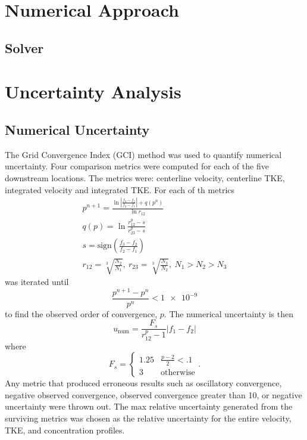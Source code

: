 \documentclass[11 pt]{article}
\begin{document}

\section{Numerical Approach}
\subsection{Solver}

\section{Uncertainty Analysis}
\subsection{Numerical Uncertainty}
	The Grid Convergence Index (GCI) method was used to quantify numerical uncertainty. Four comparison metrics were computed for each of the five downstream locations. The metrics were: centerline velocity, centerline TKE, integrated velocity and integrated TKE. For each of th metrics
		\begin{equation}
		\begin{gathered}
			p^{n+1} = \frac{\ln{|\frac{f_3 - f_2}{f_2 - f_1}|} + q(p^n)}{\ln{r_{12}}} \\ 
			q(p) = \ln\frac{r_{12}^p - s}{r_{23}^p - s} \\ 
			s = \text{sign}\left(\frac{f_3 - f_2}{f_2 - f_1}\right) \\ 
			r_{12} = \sqrt[3]{\frac{N_2}{N_1}}, \ 
				r_{23} = \sqrt[3]{\frac{N_3}{N_2}}, \ 
				N_1 > N_2 > N_3 
		\end{gathered}
		\end{equation}
	was iterated until 
		\begin{equation}
			\frac{p^{n+1} - p^n}{p^n} < \num{1e-9}
		\end{equation}
	to find the observed order of convergence, $p$. The numerical uncertainty is then 
		\begin{equation}
			u_\text{num} = \frac{F_s}{r_{12}^p - 1} |f_1 - f_2|
		\end{equation}
	where 
		\begin{equation}
			F_s = \begin{cases}
				1.25 & \frac{p - 2}{2} < .1 \\ 
				3 & \text{otherwise}
			\end{cases}. 
		\end{equation}
	Any metric that produced erroneous results such as oscillatory convergence, negative observed convergence, observed convergence greater than 10, or negative uncertainty were thrown out. The max relative uncertainty generated from the surviving metrics was chosen as the relative uncertainty for the entire velocity, TKE, and concentration profiles. 
\end{document}
